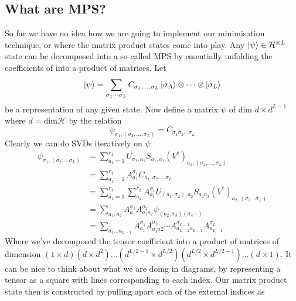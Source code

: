 \documentclass[a4paper]{article}
\begin{document}
\subsection{What are MPS?}
So far we have no idea how we are going to implement our minimisation technique,
or where the matrix product states come into play. Any $\ket{\psi}\in
\mathcal{H}^{\otimes
L}$ state can be
decomposed into a so-called MPS by essentially unfolding the coefficients of
into a product of matrices. Let 
\[
\ket{\psi}=\sum_{\sigma_1\cdots\sigma_L} C_{\sigma_1,\dots,\sigma_L}\ket{\sigma_A}\otimes\cdots\otimes\ket{\sigma_L}
\]
be a representation of any given state. Now define a matrix $\psi$ of dim $d\times
d^{L-1}$ where $d=\mathrm{dim}\mathcal{H}$ by the relation
\[\psi_{\sigma_1,(\sigma_2,\dots,\sigma_L)}=C_{\sigma_1\sigma_2\dots\sigma_L}\]
Clearly we can do SVDs iteratively on $\psi$
\begin{align*}
    \psi_{\sigma_1,(\sigma_2,\dots\sigma_L)}&=\sum_{a_1=1}^{r_1} U_{\sigma_1,a_1}
S_{a_1,a_1} (V^\dagger)_{a_1,(\sigma_2,\dots,\sigma_L)}\\
&=\sum_{a_1=1}^{r_1} A^{\sigma_1}_{a_1} C_{a_1,\sigma_2,\dots \sigma_L}\\
&=\sum_{a_1=1}^{r_1}\sum_{a_2}^{r_2} A_{a_1}^{\sigma_1}
U_{(a_1,\sigma_2),a_2} S_{a_2a_2}
(V^{\dagger})_{a_2,(\sigma_3\dots\sigma_L)}\\
&=\sum_{a_1,a_2}
A_{a_1}^{\sigma_1}A_{a_1a_2}^{\sigma_2}\psi_{(a_2,\sigma_3)(\sigma_4\cdots)}\\
&=\sum_{a_1\dots a_{L-1}} A^{\sigma_1}_{a_1} A^{\sigma_2}_{a_1a2}\cdots
A_{a_{L-2}a_{L-1}}^{\sigma_{L-1}} A_{a_{L-1}}^{\sigma_L}
\end{align*}
Where we've decomposed the tensor coefficient into a product of matrices of
dimension  $(1\times d)(d\times d^2)\dots (d^{L/2-1} \times d^{L/2})( d^{L/2}
\times d^{L/2 -1})\dots(d\times 1)$. It can be nice to think about what we are
doing in diagrams, by representing a tensor as a square with lines corresponding
to each index. Our matrix product state then is constructed by pulling apart
each of the external indices as
\end{document}
